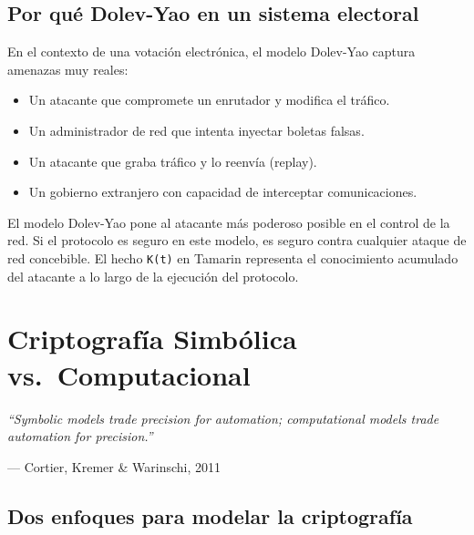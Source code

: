 \documentclass[12pt, a4paper, twoside, openright]{book}
\begin{document}
\section{Por qu\'e Dolev-Yao en un sistema electoral}

En el contexto de una votaci\'on electr\'onica, el modelo Dolev-Yao
captura amenazas muy reales:
\begin{itemize}[leftmargin=*, itemsep=4pt]
  \item Un atacante que compromete un enrutador y modifica el tr\'afico.
  \item Un administrador de red que intenta inyectar boletas falsas.
  \item Un atacante que graba tr\'afico y lo reenv\'ia (replay).
  \item Un gobierno extranjero con capacidad de interceptar
    comunicaciones.
\end{itemize}

\begin{cajaResumen}
  El modelo Dolev-Yao pone al atacante m\'as poderoso posible en el
  control de la red. Si el protocolo es seguro en este modelo, es
  seguro contra cualquier ataque de red concebible. El hecho
  \texttt{K(t)} en Tamarin representa el conocimiento acumulado
  del atacante a lo largo de la ejecuci\'on del protocolo.
\end{cajaResumen}

\chapter{Criptograf\'ia Simb\'olica vs.\ Computacional}

\epigraph{%
  \textit{``Symbolic models trade precision for automation;
  computational models trade automation for precision.''}
}{--- Cortier, Kremer \& Warinschi, 2011}

\section{Dos enfoques para modelar la criptograf\'ia}
\end{document}
